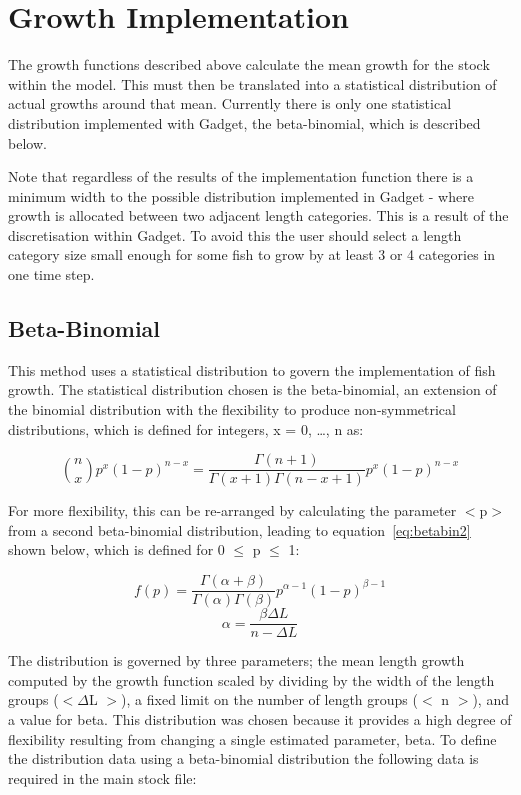 \documentclass[10pt,twoside]{book}
\begin{document}
\section{Growth Implementation}\label{sec:stockgrowthimplement}
The growth functions described above calculate the mean growth for the stock within the model. This must then be translated into a statistical distribution of actual growths around that mean.  Currently there is only one statistical distribution implemented with Gadget, the beta-binomial, which is described below.

\bigskip
Note that regardless of the results of the implementation function there is a minimum width to the possible distribution implemented in Gadget - where growth is allocated between two adjacent length categories.  This is a result of the discretisation within Gadget.  To avoid this the user should select a length category size small enough for some fish to grow by at least 3 or 4 categories in one time step.

\subsection{Beta-Binomial}
This method uses a statistical distribution to govern the implementation of fish growth.  The statistical distribution chosen is the beta-binomial, an extension of the binomial distribution with the flexibility to produce non-symmetrical distributions, which is defined for integers, x = 0, \ldots, n as:

\begin{equation}\label{eq:betabin1}
{n \choose x} p^x (1 - p)^{n - x} = \frac{\Gamma(n + 1)}{\Gamma(x + 1)\Gamma(n - x + 1)} p^x (1 - p)^{n - x}
\end{equation}

For more flexibility, this can be re-arranged by calculating the parameter $<$p$>$ from a second beta-binomial distribution, leading to equation~\ref{eq:betabin2} shown below, which is defined for 0 $\le$ p $\le$ 1:

\begin{equation}\label{eq:betabin2}
f(p) = \frac{\Gamma(\alpha + \beta)}{\Gamma(\alpha) \Gamma(\beta)}p^{\alpha - 1}(1 - p)^{\beta - 1}
\end{equation}
\begin{equation}\label{eq:betabin3}
\alpha = \frac{\beta \Delta L}{n - \Delta L}
\end{equation}

The distribution is governed by three parameters; the mean length growth computed by the growth function scaled by dividing by the width of the length groups ($<\Delta$L $>$), a fixed limit on the number of length groups ($<$ n $>$), and a value for beta.  This distribution was chosen because it provides a high degree of flexibility resulting from changing a single estimated parameter, beta.  To define the distribution data using a beta-binomial distribution the following data is required in the main stock file:
\end{document}
